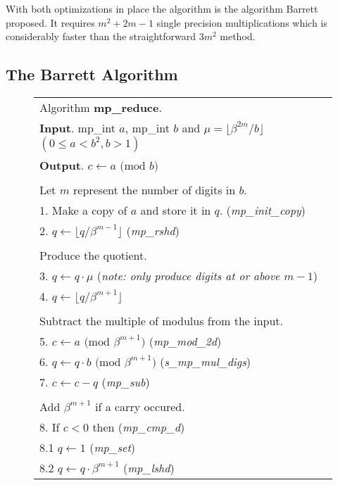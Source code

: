 \documentclass[b5paper]{book}
\begin{document}
With both optimizations in place the algorithm is the algorithm Barrett proposed.  It requires $m^2 + 2m - 1$ single precision multiplications which
is considerably faster than the straightforward $3m^2$ method.  

\subsection{The Barrett Algorithm}
\newpage\begin{figure}[!here]
\begin{small}
\begin{center}
\begin{tabular}{l}
\hline Algorithm \textbf{mp\_reduce}. \\
\textbf{Input}.   mp\_int $a$, mp\_int $b$ and $\mu = \lfloor \beta^{2m}/b \rfloor$ $(0 \le a < b^2, b > 1)$ \\
\textbf{Output}.  $c \leftarrow a \mbox{ (mod }b\mbox{)}$ \\
\hline \\
Let $m$ represent the number of digits in $b$.  \\
1.  Make a copy of $a$ and store it in $q$.  (\textit{mp\_init\_copy}) \\
2.  $q \leftarrow \lfloor q / \beta^{m - 1} \rfloor$ (\textit{mp\_rshd}) \\
\\
Produce the quotient. \\
3.  $q \leftarrow q \cdot \mu$  (\textit{note: only produce digits at or above $m-1$}) \\
4.  $q \leftarrow \lfloor q / \beta^{m + 1} \rfloor$ \\
\\
Subtract the multiple of modulus from the input. \\
5.  $c \leftarrow a \mbox{ (mod }\beta^{m+1}\mbox{)}$ (\textit{mp\_mod\_2d}) \\
6.  $q \leftarrow q \cdot b \mbox{ (mod }\beta^{m+1}\mbox{)}$ (\textit{s\_mp\_mul\_digs}) \\
7.  $c \leftarrow c - q$ (\textit{mp\_sub}) \\
\\
Add $\beta^{m+1}$ if a carry occured. \\
8.  If $c < 0$ then (\textit{mp\_cmp\_d}) \\
\hspace{3mm}8.1  $q \leftarrow 1$ (\textit{mp\_set}) \\
\hspace{3mm}8.2  $q \leftarrow q \cdot \beta^{m+1}$ (\textit{mp\_lshd}) \\

\end{tabular}
\end{center}
\end{small}
\end{figure}
\end{document}
